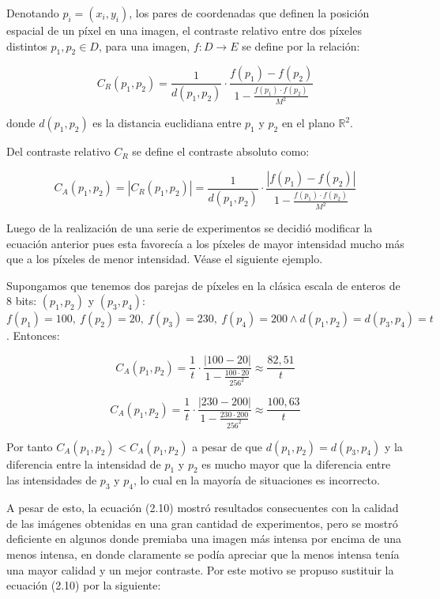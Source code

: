 Denotando $p_i =(x_i ,y_i )$, los pares de coordenadas que definen la posición espacial de un píxel en una imagen, el contraste relativo entre dos píxeles distintos $p_1, p_2 \in D$, para una imagen, $f : D \to E$ se define por la relación:

\begin{equation}
	C_R(p_1,p_2)=\frac{1}{d(p_1,p_2)}\cdot\frac{f(p_1)-f(p_2)}{1-\frac{f(p_1)\cdot f(p_2)}{M^2}}
\end{equation}

donde $d(p_1 ,p_2 )$ es la distancia euclidiana entre $p_1$ y $p_2$ en el plano $\mathbb{R}^2$.

Del contraste relativo $C_R$ se define el contraste absoluto como:

\begin{equation}
	C_A(p_1,p_2)=|C_R(p_1,p_2)|=\frac{1}{d(p_1,p_2)}\cdot\frac{|f(p_1)-f(p_2)|}{1-\frac{f(p_1)\cdot f(p_2)}{M^2}}
\end{equation}

Luego de la realizaci\'on de una serie de experimentos se decidi\'o modificar la ecuaci\'on anterior pues esta favorec\'ia a los p\'ixeles de mayor intensidad mucho m\'as que a los p\'ixeles de menor intensidad. V\'ease el siguiente ejemplo.

Supongamos que tenemos dos parejas de p\'ixeles en la cl\'asica escala de enteros de 8 bits: $(p_1,p_2)$ y $(p_3,p_4)$: $f(p_1)=100,~f(p_2)=20,~f(p_3)=230,~f(p_4)=200 \land d(p_1,p_2)=d(p_3,p_4)=t$. Entonces:

\begin{equation}
	C_A(p_1,p_2)=\frac{1}{t}\cdot\frac{|100-20|}{1-\frac{100\cdot20}{256^2}}\approx\frac{82,51}{t}
\end{equation} 

\begin{equation}
	C_A(p_1,p_2)=\frac{1}{t}\cdot\frac{|230-200|}{1-\frac{230\cdot200}{256^2}}\approx\frac{100,63}{t}
\end{equation}

Por tanto $C_A(p_1,p_2)<C_A(p_1,p_2)$ a pesar de que $d(p_1,p_2)=d(p_3,p_4)$ y la diferencia entre la intensidad de $p_1$ y $p_2$ es mucho mayor que la diferencia entre las intensidades de $p_3$ y $p_4$, lo cual en la mayor\'ia de situaciones es incorrecto.

A pesar de esto, la ecuaci\'on (2.10) mostr\'o resultados consecuentes con la calidad de las im\'agenes obtenidas en una gran cantidad de experimentos, pero se mostr\'o deficiente en algunos donde premiaba una imagen m\'as intensa por encima de una menos intensa, en donde claramente se pod\'ia apreciar que la menos intensa ten\'ia una mayor calidad y un mejor contraste. Por este motivo se propuso sustituir la ecuaci\'on (2.10) por la siguiente:

